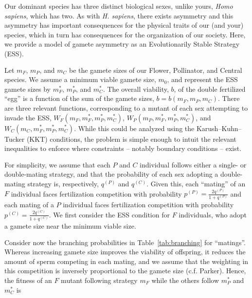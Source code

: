 

Our dominant species has three distinct biological sexes, unlike yours, \emph{Homo sapiens}, which has two. As with \emph{H. sapiens}, there exists asymmetry and this asymmetry has important consequences for the physical traits of our (and your) species, which in turn has consequences for the organization of our society. Here, we provide a model of gamete asymmetry as an Evolutionarily Stable Strategy (ESS).

Let $m_F$, $m_P$, and $m_C$ be the gamete sizes of our Flower, Pollinator, and Central species. We assume a minimum viable gamete size, $m_0$, and represent the ESS gamete sizes by  $m^*_F$, $m^*_P$, and $m^*_C$. The overall viability, $b$, of the double fertilized ``egg'' is a function of the sum of the gamete sizes, $b=b(m_F,m_P,m_C)$. There are three relevant functions, corresponding to a mutant of each sex attempting to invade the ESS, $W_F(m_F,m_F^*,m_P^*,m_C^*)$, $W_P(m_P,m_F^*,m_P^*,m_C^*)$, and $W_C(m_C,m_F^*,m_P^*,m_C^*)$. While this could be analyzed using the Karush–Kuhn–Tucker (KKT) conditions, the problem is simple enough to intuit the relevant inequalities to enforce where constraints -- notably boundary conditions -- exist.

For simplicity, we assume that each $P$ and $C$ individual follows either a single- or double-mating strategy, and that the probability of each sex adopting a double-mating strategy is, respectively, $q^{(P)}$ and $q^{(C)}$. Given this, each ``mating'' of an $F$ individual faces fertilization competition with probability $p^{(P)} = \frac{2 q^{(P)}}{1+q^{(P)}}$ and each mating of a $P$ individual faces fertilization competition with probability $p^{(C)} = \frac{2 q^{(C)}}{1+q^{(C)}}$. We first consider the ESS condition for $F$ individuals, who adopt a gamete size near the minimum viable size.

Consider now the branching probabilities in Table~\ref{tab:branching} for ``matings''. Whereas increasing gamete size improves the viability of offspring, it reduces the amount of sperm competing in each mating, and we assume that the weighting in this competition is inversely proportional to the gamete size (c.f. Parker). Hence, the fitness of an $F$ mutant following strategy $m_F$ while the others follow $m_P^*$ and $m_C^*$ is

